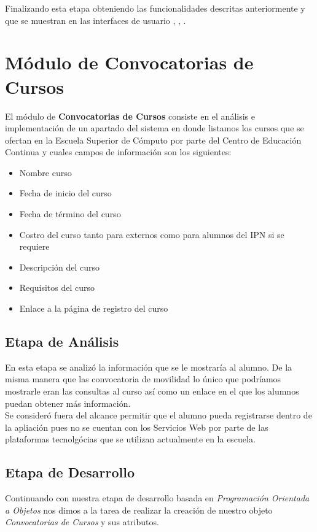 Finalizando esta etapa obteniendo las funcionalidades descritas anteriormente y que se muestran en las interfaces de usuario , , . \\

\section{Módulo de Convocatorias de Cursos}
El módulo de \textbf{Convocatorias de Cursos} consiste en el análisis e implementación de un apartado del sistema en donde listamos los cursos que se ofertan en la Escuela Superior de Cómputo por parte del Centro de Educación Continua y cuales campos de información son los siguientes:
\begin{itemize}
	\item Nombre curso
	\item Fecha de inicio del curso
	\item Fecha de término del curso
	\item Costro del curso tanto para externos como para alumnos del IPN si se requiere
	\item Descripción del curso 
	\item Requisitos del curso
	\item Enlace a la página de registro del curso
\end{itemize}  

\subsection{Etapa de Análisis}
En esta etapa se analizó la información que se le mostraría al alumno. De la misma manera que las convocatoria de movilidad lo único que podríamos mostrarle eran las consultas al curso así como un enlace en el que los alumnos puedan obtener más información. \\
Se consideró fuera del alcance permitir que el alumno pueda registrarse dentro de la apliación pues no se cuentan con los Servicios Web por parte de las plataformas tecnolgócias que se utilizan actualmente en la escuela. \\



\subsection{Etapa de Desarrollo}
Continuando con nuestra etapa de desarrollo basada en \textit{Programación Orientada a Objetos} nos dimos a la tarea de realizar la creación de nuestro objeto \textit{Convocatorias de Cursos} y sus atributos.

